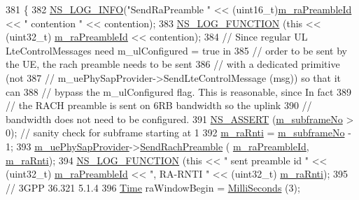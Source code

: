 \begin{DoxyCode}
381 \{
382   \hyperlink{group__logging_gafbd73ee2cf9f26b319f49086d8e860fb}{NS\_LOG\_INFO}(\textcolor{stringliteral}{"SendRaPreamble "} << (uint16\_t)\hyperlink{classns3_1_1LteUeMac_a80808b971b1fb38d1d41ef34811a0252}{m\_raPreambleId} << \textcolor{stringliteral}{" contention "} << 
      contention);
383   \hyperlink{log-macros-disabled_8h_a90b90d5bad1f39cb1b64923ea94c0761}{NS\_LOG\_FUNCTION} (\textcolor{keyword}{this} << (uint32\_t) \hyperlink{classns3_1_1LteUeMac_a80808b971b1fb38d1d41ef34811a0252}{m\_raPreambleId} << contention);
384   \textcolor{comment}{// Since regular UL LteControlMessages need m\_ulConfigured = true in}
385   \textcolor{comment}{// order to be sent by the UE, the rach preamble needs to be sent}
386   \textcolor{comment}{// with a dedicated primitive (not}
387   \textcolor{comment}{// m\_uePhySapProvider->SendLteControlMessage (msg)) so that it can}
388   \textcolor{comment}{// bypass the m\_ulConfigured flag. This is reasonable, since In fact}
389   \textcolor{comment}{// the RACH preamble is sent on 6RB bandwidth so the uplink}
390   \textcolor{comment}{// bandwidth does not need to be configured. }
391   \hyperlink{assert_8h_a6dccdb0de9b252f60088ce281c49d052}{NS\_ASSERT} (\hyperlink{classns3_1_1LteUeMac_aa8e850f6c2066e50105036c39d52a584}{m\_subframeNo} > 0); \textcolor{comment}{// sanity check for subframe starting at 1}
392   \hyperlink{classns3_1_1LteUeMac_a00052ade9b3ba115e57d9cb491a4b06a}{m\_raRnti} = \hyperlink{classns3_1_1LteUeMac_aa8e850f6c2066e50105036c39d52a584}{m\_subframeNo} - 1;
393   \hyperlink{classns3_1_1LteUeMac_a3189de2e0656b4e918c1302f7f68a007}{m\_uePhySapProvider}->\hyperlink{classns3_1_1LteUePhySapProvider_a3cbbcd0d60bf426d6da0484d4d015d39}{SendRachPreamble} (
      \hyperlink{classns3_1_1LteUeMac_a80808b971b1fb38d1d41ef34811a0252}{m\_raPreambleId}, \hyperlink{classns3_1_1LteUeMac_a00052ade9b3ba115e57d9cb491a4b06a}{m\_raRnti});
394   \hyperlink{log-macros-disabled_8h_a90b90d5bad1f39cb1b64923ea94c0761}{NS\_LOG\_FUNCTION} (\textcolor{keyword}{this} << \textcolor{stringliteral}{" sent preamble id "} << (uint32\_t) 
      \hyperlink{classns3_1_1LteUeMac_a80808b971b1fb38d1d41ef34811a0252}{m\_raPreambleId} << \textcolor{stringliteral}{", RA-RNTI "} << (uint32\_t) \hyperlink{classns3_1_1LteUeMac_a00052ade9b3ba115e57d9cb491a4b06a}{m\_raRnti});
395   \textcolor{comment}{// 3GPP 36.321 5.1.4 }
396   \hyperlink{namespacens3_1_1TracedValueCallback_a7ffd3e7c142ffe7c8a1d2db9b8de38ec}{Time} raWindowBegin = \hyperlink{group__timecivil_gaf26127cf4571146b83a92ee18679c7a9}{MilliSeconds} (3); 

\end{DoxyCode}
